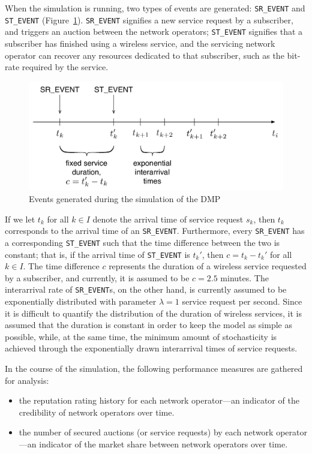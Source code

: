 When the simulation is running, two types of events are generated: \lstinline{SR_EVENT} and \lstinline{ST_EVENT} (Figure~\ref{fig:dm_events_dynamic}). \lstinline{SR_EVENT} signifies a new service request by a subscriber, and triggers an auction between the network operators; \lstinline{ST_EVENT} signifies that a subscriber has finished using a wireless service, and the servicing network operator can recover any resources dedicated to that subscriber, such as the bit-rate required by the service.
\begin{figure}[t]
	\includegraphics[width=\figsize]{3/Figures/dm_events}
	\caption{Events generated during the simulation of the DMP}
	\label{fig:dm_events_dynamic}
\end{figure}
If we let $t_k$ for all $k\in I$ denote the arrival time of service request $s_k$, then $t_k$ corresponds to the arrival time of an \lstinline{SR_EVENT}. Furthermore, every \lstinline{SR_EVENT} has a corresponding \lstinline{ST_EVENT} such that the time difference between the two is constant; that is, if the arrival time of \lstinline{ST_EVENT} is $t_k'$, then $c = t_k - t_k'$ for all $k\in I$. The time difference $c$ represents the duration of a wireless service requested by a subscriber, and currently, it is assumed to be $c=2.5$ minutes. The interarrival rate of \lstinline{SR_EVENT}s, on the other hand, is currently assumed to be exponentially distributed with parameter $\lambda=1$ service request per second. Since it is difficult to quantify the distribution of the duration of wireless services, it is assumed that the duration is constant in order to keep the model as simple as possible, while, at the same time, the minimum amount of stochasticity is achieved through the exponentially drawn interarrival times of service requests.

In the course of the simulation, the following performance measures are gathered for analysis:
\begin{itemize}
	\item the reputation rating history for each network operator---an indicator of the credibility of network operators over time.
	\item the number of secured auctions (or service requests) by each network operator---an indicator of the market share between network operators over time.
\end{itemize}

